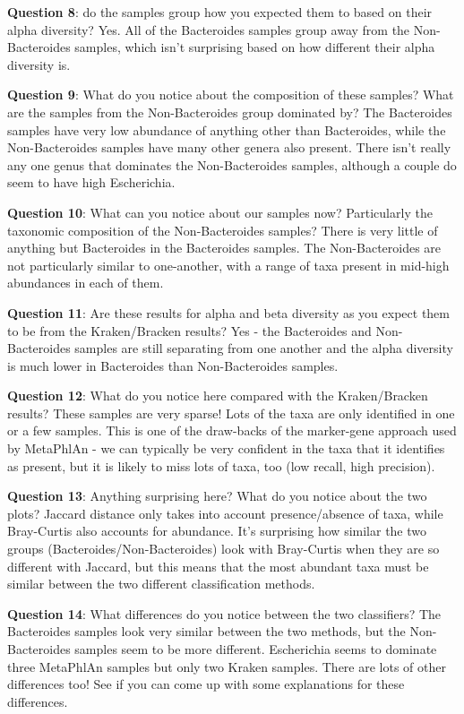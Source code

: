\documentclass[
]{book}
\begin{document}
\textbf{Question 8}: do the samples group how you expected them to based on their alpha diversity?
Yes. All of the Bacteroides samples group away from the Non-Bacteroides samples, which isn't surprising based on how different their alpha diversity is.

\textbf{Question 9}: What do you notice about the composition of these samples? What are the samples from the Non-Bacteroides group dominated by?
The Bacteroides samples have very low abundance of anything other than Bacteroides, while the Non-Bacteroides samples have many other genera also present. There isn't really any one genus that dominates the Non-Bacteroides samples, although a couple do seem to have high Escherichia.

\textbf{Question 10}: What can you notice about our samples now? Particularly the taxonomic composition of the Non-Bacteroides samples?
There is very little of anything but Bacteroides in the Bacteroides samples. The Non-Bacteroides are not particularly similar to one-another, with a range of taxa present in mid-high abundances in each of them.

\textbf{Question 11}: Are these results for alpha and beta diversity as you expect them to be from the Kraken/Bracken results?
Yes - the Bacteroides and Non-Bacteroides samples are still separating from one another and the alpha diversity is much lower in Bacteroides than Non-Bacteroides samples.

\textbf{Question 12}: What do you notice here compared with the Kraken/Bracken results?
These samples are very sparse! Lots of the taxa are only identified in one or a few samples. This is one of the draw-backs of the marker-gene approach used by MetaPhlAn - we can typically be very confident in the taxa that it identifies as present, but it is likely to miss lots of taxa, too (low recall, high precision).

\textbf{Question 13}: Anything surprising here? What do you notice about the two plots?
Jaccard distance only takes into account presence/absence of taxa, while Bray-Curtis also accounts for abundance. It's surprising how similar the two groups (Bacteroides/Non-Bacteroides) look with Bray-Curtis when they are so different with Jaccard, but this means that the most abundant taxa must be similar between the two different classification methods.

\textbf{Question 14}: What differences do you notice between the two classifiers?
The Bacteroides samples look very similar between the two methods, but the Non-Bacteroides samples seem to be more different. Escherichia seems to dominate three MetaPhlAn samples but only two Kraken samples. There are lots of other differences too! See if you can come up with some explanations for these differences.
\end{document}
